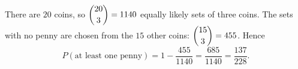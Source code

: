There are $20$ coins, so $\dbinom{20}{3}=1140$ equally likely sets of three coins. The sets with no penny are chosen from the $15$ other coins: $\dbinom{15}{3}=455$. Hence
\[
P(\text{at least one penny})=1-\dfrac{455}{1140}=\dfrac{685}{1140}=\boxed{\dfrac{137}{228}}.
\]
